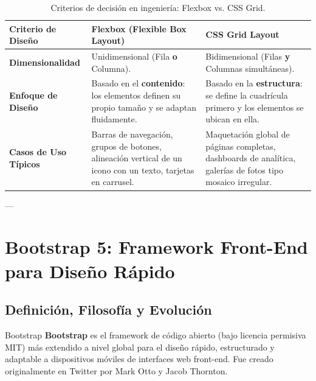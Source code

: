 \begin{table}[htbp]
\centering
\caption{Criterios de decisión en ingeniería: Flexbox vs. CSS Grid.}
\label{tab:flexbox-vs-grid}
\begin{tabularx}{\textwidth}{p{3.2cm} X X}
\toprule
\textbf{Criterio de Diseño} & \textbf{Flexbox (Flexible Box Layout)} & \textbf{CSS Grid Layout} \\
\midrule
\textbf{Dimensionalidad} & Unidimensional (Fila \textbf{o} Columna). & Bidimensional (Filas \textbf{y} Columnas simultáneas). \\
\textbf{Enfoque de Diseño} & Basado en el \textbf{contenido}: los elementos definen su propio tamaño y se adaptan fluidamente. & Basado en la \textbf{estructura}: se define la cuadrícula primero y los elementos se ubican en ella. \\
\textbf{Casos de Uso Típicos} & Barras de navegación, grupos de botones, alineación vertical de un icono con un texto, tarjetas en carrusel. & Maquetación global de páginas completas, dashboards de analítica, galerías de fotos tipo mosaico irregular. \\
\bottomrule
\end{tabularx}
\end{table}

---

\section{Bootstrap 5: Framework Front-End para Diseño Rápido}

\subsection{Definición, Filosofía y Evolución}

\begin{definicion}{Bootstrap}
\textbf{Bootstrap} es el framework de código abierto (bajo licencia permisiva MIT) más extendido a nivel global para el diseño rápido, estructurado y adaptable a dispositivos móviles de interfaces web front-end. Fue creado originalmente en Twitter por Mark Otto y Jacob Thornton.
\end{definicion}

